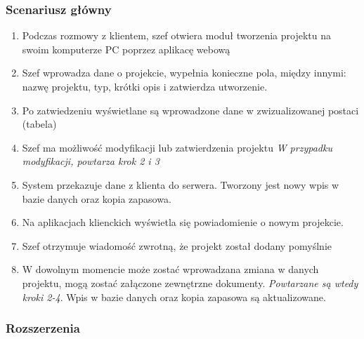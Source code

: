 \documentclass{article}
\begin{document}
\begin{tcolorbox}
    \subsubsection*{Scenariusz główny}
    \begin{enumerate}
        \item Podczas rozmowy z klientem, szef otwiera moduł tworzenia projektu na swoim komputerze PC poprzez aplikacę webową
        \item Szef wprowadza dane o projekcie, wypełnia konieczne pola, między innymi: nazwę projektu, typ, krótki opis i zatwierdza utworzenie.
        \item Po zatwiedzeniu wyświetlane są wprowadzone dane w zwizualizowanej postaci (tabela)
        \item Szef ma możliwość modyfikacji lub zatwierdzenia projektu \newline \textit{W przypadku modyfikacji, powtarza krok 2 i 3}
        \item System przekazuje dane z klienta do serwera. Tworzony jest nowy wpis w bazie danych oraz kopia zapasowa.
        \item Na aplikacjach klienckich wyświetla się powiadomienie o nowym projekcie.
        \item Szef otrzymuje wiadomość zwrotną, że projekt został dodany pomyślnie
        \item W dowolnym momencie może zostać wprowadzana zmiana w danych projektu, mogą zostać załączone zewnętrzne dokumenty. \textit{Powtarzane są wtedy kroki 2-4}. Wpis w bazie danych oraz kopia zapasowa są aktualizowane.
    \end{enumerate}


    \subsubsection*{Rozszerzenia}


\end{tcolorbox}
\end{document}
